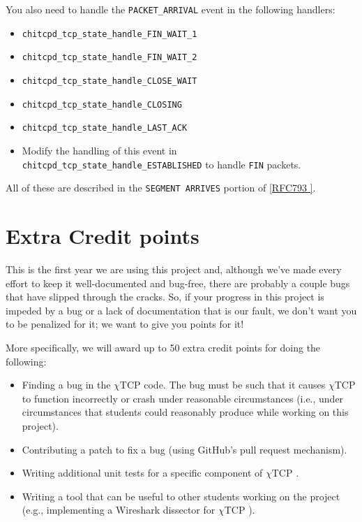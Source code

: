 \documentclass[10pt]{article}
\newcommand{\chitcp}{$\chi$\textsf{TCP} }
\newcommand{\RFCsection}[2]{\href{http://tools.ietf.org/html/rfc#1\#section-#2}{[RFC#1 \textsection #2]}}
\newcommand{\points}[1]{{\sffamily\mdseries\guillemotleft #1 points\guillemotright{}}}
\begin{document}
\begin{itemize}
 You also need to handle the \texttt{PACKET\_ARRIVAL} event in the following handlers:
 
  \begin{itemize}
  \item \texttt{chitcpd\_tcp\_state\_handle\_FIN\_WAIT\_1}
  \item \texttt{chitcpd\_tcp\_state\_handle\_FIN\_WAIT\_2}
  \item \texttt{chitcpd\_tcp\_state\_handle\_CLOSE\_WAIT}
  \item \texttt{chitcpd\_tcp\_state\_handle\_CLOSING}
  \item \texttt{chitcpd\_tcp\_state\_handle\_LAST\_ACK}
  \item Modify the handling of this event in \texttt{chitcpd\_tcp\_state\_handle\_ESTABLISHED} to handle \texttt{FIN} packets.
  \end{itemize}
  
 All of these are described in the \texttt{SEGMENT ARRIVES} portion of \RFCsection{793}{3.9}.
\end{itemize}


\section{Extra Credit \points{50}}
\label{sec:extra}

This is the first year we are using this project and, although we've made every effort to keep it well-documented and bug-free, there are probably a couple bugs that have slipped through the cracks. So, if your progress in this project is impeded by a bug or a lack of documentation that is our fault, we don't want you to be penalized for it; we want to give you points for it!

More specifically, we will award up to 50 extra credit points for doing the following:

\begin{itemize}
 \item Finding a bug in the \chitcp code. The bug must be such that it causes \chitcp to function incorrectly or crash under reasonable circumstances (i.e., under circumstances that students could reasonably produce while working on this project).
 \item Contributing a patch to fix a bug (using GitHub's pull request mechanism). 
 \item Writing additional unit tests for a specific component of \chitcp.
 \item Writing a tool that can be useful to other students working on the project (e.g., implementing a Wireshark dissector for \chitcp).
\end{itemize}
\end{document}
